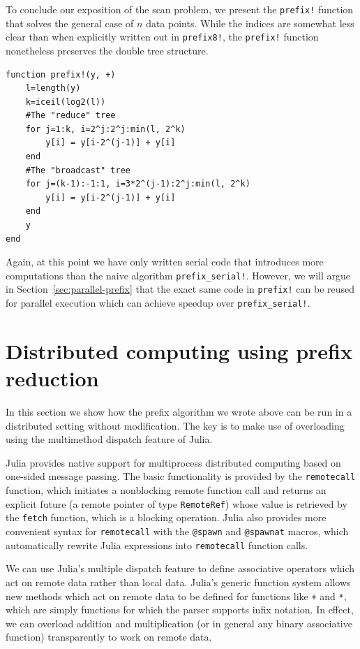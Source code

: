 \documentclass{sig-alternate}
\newcommand{\code}[1]{\texttt{#1}}
\begin{document}
To conclude our exposition of the scan problem, we present the \code{prefix!}
function that solves the general case of $n$ data points. While the indices are
somewhat less clear than when explicitly written out in \code{prefix8!}, the
\code{prefix!} function nonetheless preserves the double tree structure.

\begin{verbatim}
function prefix!(y, +)
    l=length(y)
    k=iceil(log2(l))
    #The "reduce" tree
    for j=1:k, i=2^j:2^j:min(l, 2^k)
        y[i] = y[i-2^(j-1)] + y[i]
    end
    #The "broadcast" tree
    for j=(k-1):-1:1, i=3*2^(j-1):2^j:min(l, 2^k)
        y[i] = y[i-2^(j-1)] + y[i]
    end
    y
end
\end{verbatim}

Again, at this point we have only written serial code that introduces more
computations than the naive algorithm \code{prefix\allowbreak\_serial!}. However, we will
argue in Section~\ref{sec:parallel-prefix} that the exact same code in
\code{prefix!} can be reused for parallel execution which can achieve speedup
over \code{prefix\allowbreak\_serial!}.

\section{Distributed computing using prefix reduction}

In this section we show how the prefix algorithm we wrote above can be run in a
distributed setting without modification. The key is to make use of overloading
using the multimethod dispatch feature of Julia.

Julia provides native support for multiprocess distributed computing based on
one-sided message passing. The basic functionality is provided by the
\code{remotecall} function, which initiates a nonblocking remote function call
and returns an explicit future (a remote pointer of type \code{RemoteRef})
whose value is retrieved by the \code{fetch} function, which is a blocking
operation. Julia also provides more convenient syntax for \code{remotecall}
with the \code{@spawn} and \code{@spawnat} macros, which automatically rewrite
Julia expressions into \code{remotecall} function calls.

We can use Julia's multiple dispatch feature to define associative operators
which act on remote data rather than local data. Julia's generic function
system allows new methods which act on remote data to be defined for functions
like \code{+} and \code{*}, which are simply functions for which the parser
supports infix notation. In effect, we can overload addition and multiplication
(or in general any binary associative function) transparently to work on remote
data.
\end{document}
